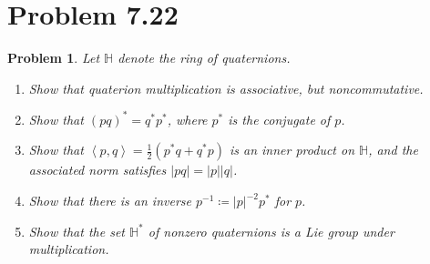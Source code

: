 \documentclass[11pt, letterpaper]{article}
\theoremstyle{plain}
\newtheorem{problem}{Problem}
\begin{document}
\section{Problem 7.22}
\begin{problem}\label{7}
	Let $\mathbb{H} $ denote the ring of quaternions.
	\begin{enumerate}
		\item Show that quaterion multiplication is associative, but noncommutative.
		\item Show that $(pq)^*=q^*p^*$, where $p^*$ is the conjugate of $p$.
		\item Show that $\left\langle p,q \right\rangle =\frac{1}{2} \left( p^*q+q^*p \right) $ is an inner product on $\mathbb{H} $, and the associated norm satisfies $\left| pq \right| =\left| p \right| \left| q \right| $.
		\item Show that there is an inverse $p ^{-1} \coloneqq \left| p \right| ^{-2} p^*$ for $p$.
		\item Show that the set $\mathbb{H} ^*$ of nonzero quaternions is a Lie group under multiplication.
	\end{enumerate}
\end{problem}
\end{document}
